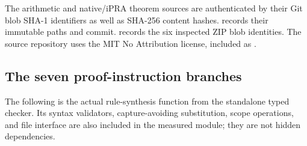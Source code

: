 The arithmetic and native/iPRA theorem sources are authenticated by their
Git blob SHA-1 identifiers as well as SHA-256 content hashes.
 records their immutable paths and commit.
 records the six inspected ZIP blob
identities. The source repository uses the MIT No Attribution license,
included as .

\clearpage
\subsection{The seven proof-instruction branches}

The following is the actual rule-synthesis function from the standalone
typed checker. Its syntax validators, capture-avoiding substitution,
scope operations, and file interface are also included in the measured
module; they are not hidden dependencies.

